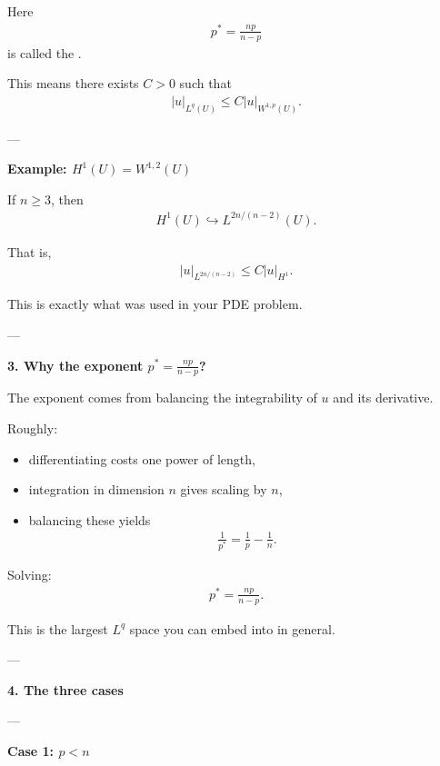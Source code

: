 \documentclass[12pt,a4paper]{report}
\begin{document}
\begin{description}
\begin{description}
Here
\begin{align*}
p^*=\frac{np}{n-p}
\end{align*}
is called the .

This means there exists $C>0$ such that
\begin{align*}
|u|_{L^q(U)}\le C|u|_{W^{1,p}(U)}.
\end{align*}

---

\textbf{Example: $H^1(U)=W^{1,2}(U)$}

If $n\ge 3$, then
\begin{align*}
H^1(U)\hookrightarrow L^{2n/(n-2)}(U).
\end{align*}

That is,
\begin{align*}
|u|_{L^{2n/(n-2)}}\le C|u|_{H^1}.
\end{align*}

This is exactly what was used in your PDE problem.

---

\item \textbf{3. Why the exponent $p^*=\frac{np}{n-p}$?}

The exponent comes from balancing the integrability of $u$ and its derivative.

Roughly:

    \begin{itemize}
    \item differentiating costs one power of length,
    \item integration in dimension $n$ gives scaling by $n$,
    \item balancing these yields
  \begin{align*}
  \frac{1}{p^*}=\frac{1}{p}-\frac{1}{n}.
  \end{align*}
    \end{itemize}

Solving:
\begin{align*}
p^*=\frac{np}{n-p}.
\end{align*}

This is the largest $L^q$ space you can embed into in general.

---

\item \textbf{4. The three cases}

---
    \begin{description}
    \item \textbf{Case 1: $p<n$}


\end{description}
\end{description}
\end{description}
\end{document}
